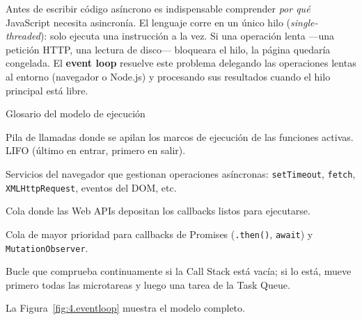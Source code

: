 \documentclass[11pt,a4paper,openany]{book}
\begin{document}
	Antes de escribir código asíncrono es indispensable comprender
	\emph{por qué} JavaScript necesita asincronía. El lenguaje corre
	en un único hilo (\emph{single-threaded}): solo ejecuta una
	instrucción a la vez. Si una operación lenta —una petición HTTP,
	una lectura de disco— bloqueara el hilo, la página quedaría
	congelada. El \textbf{event loop} resuelve este problema delegando
	las operaciones lentas al entorno (navegador o Node.js) y
	procesando sus resultados cuando el hilo principal está libre.
	
	\begin{cajadefinicion}{Glosario del modelo de ejecución}
		\begin{description}[leftmargin=4em,style=nextline]
			\item[\textbf{Call Stack}] Pila de llamadas donde se apilan los
			marcos de ejecución de las funciones activas. LIFO (último en
			entrar, primero en salir).
			\item[\textbf{Web APIs}] Servicios del navegador que gestionan
			operaciones asíncronas: \texttt{setTimeout}, \texttt{fetch},
			\texttt{XMLHttpRequest}, eventos del DOM, etc.
			\item[\textbf{Callback / Task Queue}] Cola donde las Web APIs
			depositan los callbacks listos para ejecutarse.
			\item[\textbf{Microtask Queue}] Cola de mayor prioridad para
			callbacks de Promises (\texttt{.then()}, \texttt{await}) y
			\texttt{MutationObserver}.
			\item[\textbf{Event Loop}] Bucle que comprueba continuamente si
			la Call Stack está vacía; si lo está, mueve primero todas las
			microtareas y luego una tarea de la Task Queue.
		\end{description}
	\end{cajadefinicion}
	
	La Figura~\ref{fig:4.eventloop} muestra el modelo completo.
	
\end{document}
